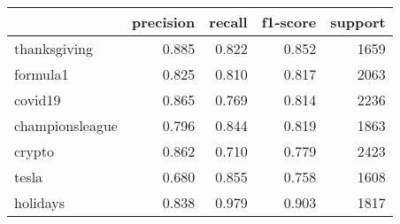 \begin{tabular}{lrrrr}
\toprule
{} &  precision &  recall &  f1-score &  support \\
\midrule
thanksgiving    &      0.885 &   0.822 &     0.852 &     1659 \\
formula1        &      0.825 &   0.810 &     0.817 &     2063 \\
covid19         &      0.865 &   0.769 &     0.814 &     2236 \\
championsleague &      0.796 &   0.844 &     0.819 &     1863 \\
crypto          &      0.862 &   0.710 &     0.779 &     2423 \\
tesla           &      0.680 &   0.855 &     0.758 &     1608 \\
holidays        &      0.838 &   0.979 &     0.903 &     1817 \\
\bottomrule
\end{tabular}
